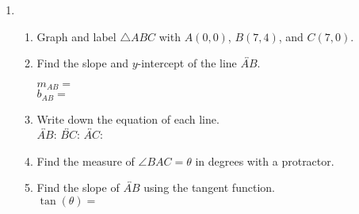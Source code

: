 \begin{enumerate}
    \item \begin{enumerate}
      \item Graph and label $\triangle ABC$ with $A(0,0)$, $B(7,4)$, and $C(7,0)$.
      \begin{center}
      \end{center}
      \item Find the slope and $y$-intercept of the line $\overleftrightarrow{AB}$.
        \begin{multicols}{2}
          $m_{AB}=$ \\
          $b_{AB}=$
        \end{multicols} \vspace{0.5cm}
      \item Write down the equation of each line. \\[0.5cm]
        $\overleftrightarrow{AB}$: \hfill
        $\overleftrightarrow{BC}$: \hfill
        $\overleftrightarrow{AC}$: \hspace{2cm}
      \vspace{2cm}
      \item Find the measure of $\angle BAC=\theta$ in degrees with a protractor. \vspace{0.5cm}
      \item Find the slope of $\overleftrightarrow{AB}$ using the tangent function.\\[0.5cm]
      $\displaystyle \tan(\theta)=$
      \vspace{2cm}
    \end{enumerate}

\end{enumerate}

